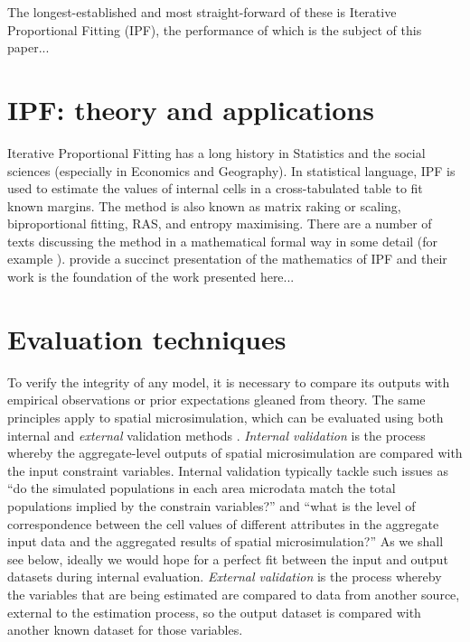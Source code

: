 \documentclass[a4paper,10pt]{article}
\begin{document}
The longest-established and most straight-forward of these is Iterative Proportional Fitting (IPF), the performance of which is the subject of this paper...





\section{IPF: theory and applications}
Iterative Proportional Fitting has a long history in Statistics and the social
sciences (especially in Economics and Geography).
In statistical language, IPF is used to estimate the values of internal
cells in a cross-tabulated table to fit known margins.
The method is also known as matrix raking or scaling,
biproportional fitting, RAS, and entropy maximising.
There are a number of texts discussing the method in a mathematical formal
way in some detail (for example \citealp{Mosteller1968, Fienberg1970, Pritchard2012}).
\citep{Birkin1988} provide a succinct presentation of the
mathematics of IPF and their work is the foundation of
the work presented here...%

\section{Evaluation techniques}

To verify the integrity of any model, it is necessary to compare its outputs
with empirical observations or prior expectations gleaned from theory.
The same principles apply to spatial microsimulation, which can be evaluated using
both internal and \emph{external} validation methods \citep{Edwards2009}.
\emph{Internal validation} is the process whereby
the aggregate-level outputs of spatial microsimulation are compared with
the input constraint variables. Internal validation typically tackle such issues
as ``do the simulated populations in each area
microdata match the total populations implied by the constrain variables?''
and ``what is the level of correspondence between the cell values of different
attributes in the aggregate input data and the aggregated results of spatial microsimulation?''
As we shall see below, ideally we would hope for a perfect fit between the input
and output datasets during internal evaluation.
\emph{External validation} is the process whereby the variables that are
being estimated are compared to data from another source,
external to the estimation process, so the output dataset is compared with
another known dataset for those variables.
\end{document}
